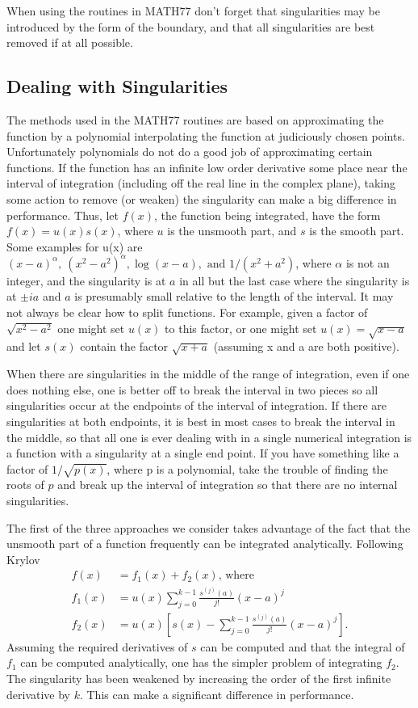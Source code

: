\documentclass[twoside]{MATH77}
\begin{document}
When using the routines in MATH77 don't forget that singularities may be
introduced by the form of the boundary, and that all singularities are
best removed if at all possible.

\subsection{Dealing with Singularities}\label{sing}

The methods used in the MATH77 routines are based on approximating
the function by a polynomial interpolating the function at
judiciously chosen points.  Unfortunately polynomials do not do a
good job of approximating certain functions.  If the function has an
infinite low order derivative some place near the interval of
integration (including off the real line in the complex plane),
taking some action to remove (or weaken) the singularity can make a
big difference in performance.  Thus, let $f(x)$, the function being
integrated, have the form $f(x) = u(x) s(x)$, where $u$ is the
unsmooth part, and $s$ is the smooth part.  Some examples for u(x) are
$(x - a)^\alpha,\ (x^2-a^2)^\alpha, \log (x-a),\text{ and } 1 / (x^2
+ a^2)$, where $\alpha $ is not an integer, and the singularity is at
$a$ in all but the last case where the singularity is at $\pm ia$ and
$a$ is presumably small relative to the length of the interval.  It
may not always be clear how to split functions.  For example, given a
factor of $\sqrt{x^2-a^2}$ one might set $u(x)$ to this factor, or
one might set $u(x) = \sqrt{x-a}$ and let $s(x)$ contain the factor
$\sqrt{x+a}$ (assuming x and a are both positive).

When there are singularities in the middle of the range of
integration, even if one does nothing else, one is better off to break
the interval in two pieces so all singularities occur at the
endpoints of the interval of integration.  If there are singularities
at both endpoints, it is best in most cases to break the interval in
the middle, so that all one is ever dealing with in a single
numerical integration is a function with a singularity at a single
end point.  If you have something like a factor of $1 / \sqrt{p(x)}$,
where p is a polynomial, take the trouble of finding the roots of $p$
and break up the interval of integration so that there are no internal
singularities.

The first of the three approaches we consider takes advantage of the fact
that the unsmooth part of a function frequently can be integrated
analytically.  Following Krylov \cite[p.203]{Krylov:1962:ACI}
\begin{align*}
f(x) & = f_1(x) + f_2(x)\text{,  where}\\
f_1(x) & = u(x) \sum_{j=0}^{k-1} \frac {s^{(j)}(a)}{j!} (x-a)^j
\\
f_2(x) & = u(x) \left [ s(x) - \sum_{j=0}^{k-1} \frac {s^{(j)}(a)}{j!}
(x-a)^j \right ].
\end{align*}
Assuming the required derivatives of $s$ can be computed and that
the integral of $f_1$ can be computed analytically, one has the simpler
problem of integrating $f_2$.  The singularity has been weakened by
increasing the order of the first infinite derivative by $k$.  This can
make a significant difference in performance.
\end{document}

